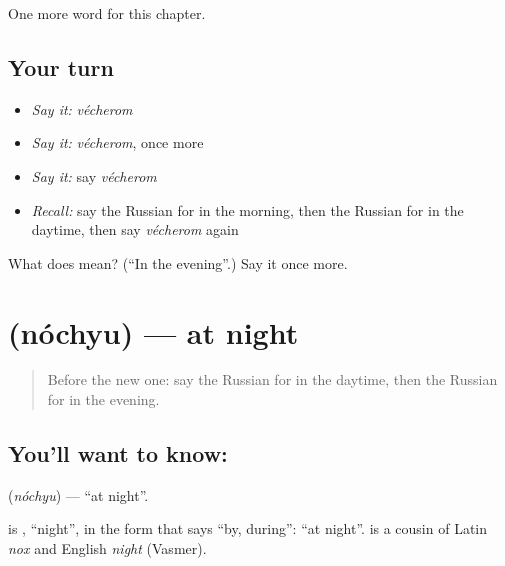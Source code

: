 \begin{grammarlens}[title={What you've built}]
One more word for this chapter.
\end{grammarlens}

\subsection*{Your turn}
\begin{itemize}
\raggedright
  \item \emph{Say it:} \emph{vécherom}
  \item \emph{Say it:} \emph{vécherom}, once more
  \item \emph{Say it:} say \emph{vécherom}
  \item \emph{Recall:} say the Russian for in the morning, then the Russian for in the daytime, then say \emph{vécherom} again
\end{itemize}

\begin{tcolorbox}[breakable,colback=teal!4,colframe=teal!35!black,title={Before you move on}]
What does  mean? (\textquotedblleft{}In the evening\textquotedblright{}.) Say it once more.
\end{tcolorbox}
\section[\texorpdfstring{\ru{ночью} (nóchyu)}{ночью (nóchyu)}]{ (nóchyu) — at night}

\label{lesson:RU-C84-at-night}



\begin{quote}
Before the new one: say the Russian for in the daytime, then the Russian for in the evening.
\end{quote}

\subsection*{You'll want to know: }
\textbf{} (\emph{nóchyu}) — \textquotedblleft{}at night\textquotedblright{}.

\begin{cousinweb}
\textbf{} is \emph{}, \textquotedblleft{}night\textquotedblright{}, in the form that says \textquotedblleft{}by, during\textquotedblright{}: \textquotedblleft{}at night\textquotedblright{}. \emph{} is a cousin of Latin \emph{nox} and English \emph{night} (Vasmer).
\end{cousinweb}

